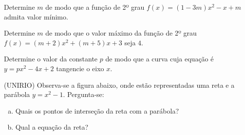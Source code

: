 \begin{secExercicios}
\begin{exer}
\begin{center}
    \end{center}
\end{exer}

\begin{exer}
    Determine $m$ de modo que a função de 2º grau $f(x)=(1-3m)x^2-x+m$ admita valor mínimo.
\end{exer}

\begin{exer}
    Determine $m$ de modo que o valor máximo da função de 2º grau $f(x)=(m+2)x^2+(m+5)x+3$ seja $4$.
\end{exer}

\begin{exer}
    Determine o valor da constante $p$ de modo que a curva cuja equação é $y=px^2-4x+2$ tangencie o eixo $x$.
\end{exer}

\begin{exer}
    (UNIRIO) Observa-se a figura abaixo, onde estão representadas uma reta e a parábola $y=x^2-1$. Pergunta-se:

    \begin{center}
    \end{center}
    \begin{enumerate}[a)]
        \item Quais os pontos de interseção da reta com a parábola?
        \item Qual a equação da reta?
    \end{enumerate}
\end{exer}


\end{secExercicios}

